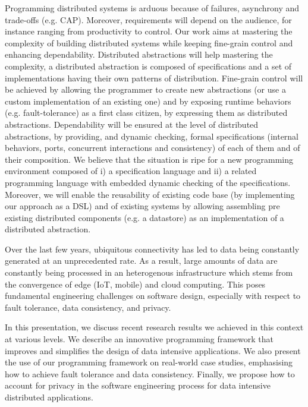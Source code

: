 \documentclass[a4paper,UKenglish]{dagrep-v2018}
\begin{document}
Programming distributed systems is arduous because of failures, asynchrony and trade-offs (e.g. CAP). Moreover, requirements will depend on the audience, for instance ranging from productivity to control.
Our work aims at mastering the complexity of building distributed systems while keeping fine-grain control and enhancing dependability. Distributed abstractions will help mastering the complexity, a distributed abstraction is composed of specifications and a set of implementations having their own patterns of distribution. Fine-grain control will be achieved by allowing the programmer to create new abstractions (or use a custom implementation of an existing one) and by exposing runtime behaviors (e.g. fault-tolerance) as a first class citizen, by expressing them as distributed abstractions. Dependability will be ensured at the level of distributed abstractions, by providing, and dynamic checking, formal specifications (internal behaviors, ports, concurrent interactions and consistency) of each of them and of their composition.
We believe that the situation is ripe for a new programming environment composed of i) a specification language and ii) a related programming language with embedded dynamic checking of the specifications. Moreover, we will enable the reusability of existing code base (by implementing our approach as a DSL) and of existing systems by allowing assembling pre existing distributed components (e.g. a datastore) as an implementation of a distributed abstraction.



\license

Over the last few years, ubiquitous connectivity has led to data being constantly generated at an unprecedented rate. As a result, large amounts of data are constantly being processed in 
an heterogenous infrastructure which stems from the convergence of edge (IoT, mobile) and cloud computing. This poses fundamental engineering challenges on software design, especially with respect to fault tolerance, data consistency, and privacy.

In this presentation, we discuss recent research results we achieved in this context at various levels. We describe an innovative programming framework that improves and simplifies the design of data intensive applications. We also present the use of our programming framework on real-world case studies, emphasising how to achieve fault tolerance and data consistency. Finally, we propose how to account for privacy in the software engineering process for data intensive distributed applications.
\end{document}
